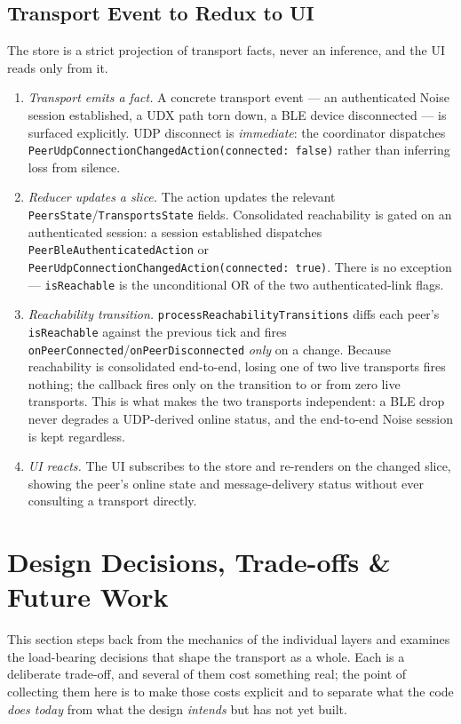 \documentclass[11pt]{report}
\newcommand{\code}[1]{\texttt{\small #1}}
\begin{document}
\subsection{Transport Event to Redux to UI}

The store is a strict projection of transport facts, never an inference, and the
UI reads only from it.

\begin{enumerate}
  \item \emph{Transport emits a fact.} A concrete transport event ---
    an authenticated Noise session established, a UDX path torn down, a BLE
    device disconnected --- is surfaced explicitly. UDP disconnect is
    \emph{immediate}: the coordinator dispatches
    \code{PeerUdpConnectionChangedAction(connected: false)} rather than inferring
    loss from silence.
  \item \emph{Reducer updates a slice.} The action updates the relevant
    \code{PeersState}/\code{TransportsState} fields. Consolidated reachability is
    gated on an authenticated session: a session established dispatches
    \code{PeerBleAuthenticatedAction} or
    \code{PeerUdpConnectionChangedAction(connected: true)}. There is no
    exception --- \code{isReachable} is the unconditional OR of the two
    authenticated-link flags.
  \item \emph{Reachability transition.} \code{processReachabilityTransitions}
    diffs each peer's \code{isReachable} against the previous tick and fires
    \code{onPeerConnected}/\code{onPeerDisconnected} \emph{only} on a change.
    Because reachability is consolidated end-to-end, losing one of two live
    transports fires nothing; the callback fires only on the transition to or
    from zero live transports. This is what makes the two transports
    independent: a BLE drop never degrades a UDP-derived online status, and the
    end-to-end Noise session is kept regardless.
  \item \emph{UI reacts.} The UI subscribes to the store and re-renders on the
    changed slice, showing the peer's online state and message-delivery status
    without ever consulting a transport directly.
\end{enumerate}

\section{Design Decisions, Trade-offs \& Future Work}

This section steps back from the mechanics of the individual layers and examines the load-bearing decisions that shape the transport as a whole. Each is a deliberate trade-off, and several of them cost something real; the point of collecting them here is to make those costs explicit and to separate what the code \emph{does today} from what the design \emph{intends} but has not yet built.
\end{document}
